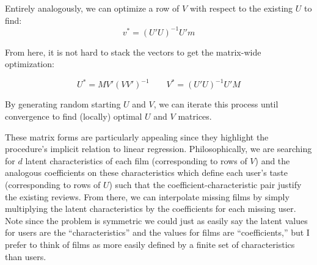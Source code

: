 \documentclass{article}
\begin{document}
\begin{appendices}
Entirely analogously, we can optimize a row of $V$ with respect to the existing $U$ to find:
$$v^* = (U'U)^{-1}U'm$$

From here, it is not hard to stack the vectors to get the matrix-wide optimization:

$$U^* = MV'(VV')^{-1} \qquad V^* = (U'U)^{-1}U'M$$

By generating random starting $U$ and $V$, we can iterate this process until convergence to find (locally) optimal $U$ and $V$ matrices.

These matrix forms are particularly appealing since they highlight the procedure's implicit relation to linear regression. Philosophically, we are searching for $d$ latent characteristics of each film (corresponding to rows of $V$) and the analogous coefficients on these characteristics which define each user's taste (corresponding to rows of $U$) such that the coefficient-characteristic pair justify the existing reviews. From there, we can interpolate missing films by simply multiplying the latent characteristics by the coefficients for each missing user. Note since the problem is symmetric we could just as easily say the latent values for users are the ``characteristics'' and the values for films are ``coefficients,'' but I prefer to think of films as more easily defined by a finite set of characteristics than users.

\end{appendices}
\end{document}
